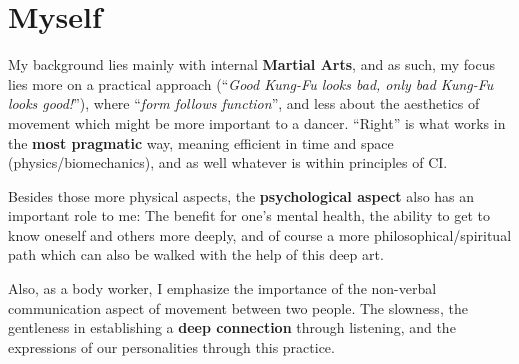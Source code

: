 \section{Myself}\label{sec:myself}

My background lies mainly with internal \textbf{Martial Arts}, and as such, my focus lies more on a practical approach (``\textit{Good Kung-Fu looks bad, only bad Kung-Fu looks good!}''), where ``\textit{form follows function}'', and less about the aesthetics of movement which might be more important to a dancer.
``Right'' is what works in the \textbf{most pragmatic} way, meaning efficient in time and space (physics/biomechanics), and as well whatever is within principles of CI.

Besides those more physical aspects, the \textbf{psychological aspect} also has an important role to me: The benefit for one's mental health, the ability to get to know oneself and others more deeply, and of course a more philosophical/spiritual path which can also be walked with the help of this deep art.

Also, as a body worker, I emphasize the importance of the non-verbal communication aspect of movement between two people.
The slowness, the gentleness in establishing a \textbf{deep connection} through listening, and the expressions of our personalities through this practice.
